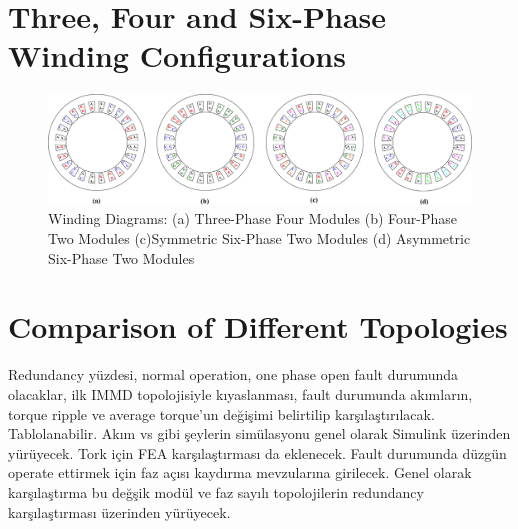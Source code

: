 \documentclass[a4paper,11pt]{article}
\begin{document}
\section{\normalsize\textbf{Three, Four and Six-Phase Winding Configurations}}
\begin{figure}[ht!]
    \centering
    \includegraphics{windings.png}
    \caption{Winding Diagrams: (a) Three-Phase Four Modules (b) Four-Phase Two Modules (c)Symmetric Six-Phase Two Modules (d) Asymmetric Six-Phase Two Modules  }
    \label{fig:winding}
\end{figure}

\section{\normalsize\textbf{Comparison of Different Topologies}}
Redundancy yüzdesi, normal operation, one phase open fault durumunda olacaklar, ilk IMMD topolojisiyle kıyaslanması, fault durumunda akımların, torque ripple ve average torque'un değişimi belirtilip karşılaştırılacak. Tablolanabilir. Akım vs gibi şeylerin simülasyonu genel olarak Simulink üzerinden yürüyecek. Tork için FEA karşılaştırması da eklenecek. Fault durumunda düzgün operate ettirmek için faz açısı kaydırma mevzularına girilecek. Genel olarak karşılaştırma bu değşik modül ve faz sayılı topolojilerin redundancy karşılaştırması üzerinden yürüyecek. 
\end{document}
